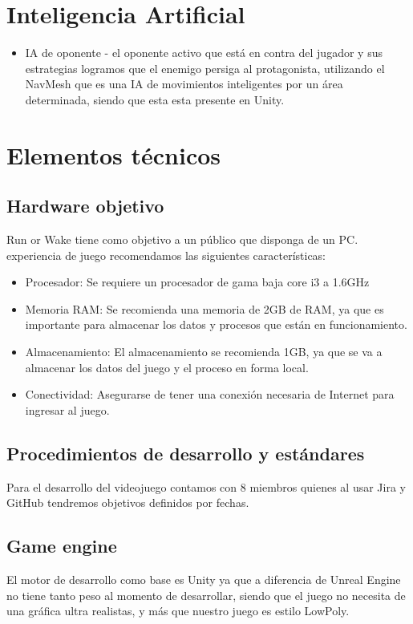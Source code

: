 \section{Inteligencia Artificial}
\begin{itemize}
	\item IA de oponente - el oponente activo que está en contra del jugador y sus estrategias
	      logramos que el enemigo persiga al protagonista, utilizando el NavMesh que es una IA de
	      movimientos inteligentes por un área determinada, siendo que esta esta presente en Unity.
\end{itemize}

\section{Elementos técnicos}
\subsection{Hardware objetivo}
Run or Wake tiene como objetivo a un público que disponga de un 
PC.
experiencia de juego recomendamos las siguientes características:
\begin{itemize}
	\item Procesador: Se requiere un procesador de gama baja core i3 a 1.6GHz
	\item Memoria RAM: Se recomienda una memoria de 2GB de RAM, ya que es importante para almacenar
	      los datos y procesos que están en funcionamiento.
	\item Almacenamiento: El almacenamiento se recomienda 1GB, ya que se va a almacenar los datos
	      del juego y el proceso en forma local.
	\item Conectividad: Asegurarse de tener una conexión necesaria de Internet para ingresar al juego.
\end{itemize}

\subsection{ Procedimientos de desarrollo y estándares}
Para el desarrollo del videojuego contamos con 8 miembros quienes al usar Jira y GitHub tendremos objetivos
definidos por fechas.

\subsection{Game engine}
El motor de desarrollo como base es Unity ya que a diferencia de Unreal Engine no tiene tanto
peso al momento de desarrollar, siendo que el juego no necesita de una gráfica ultra realistas,
y más que nuestro juego es estilo LowPoly.

